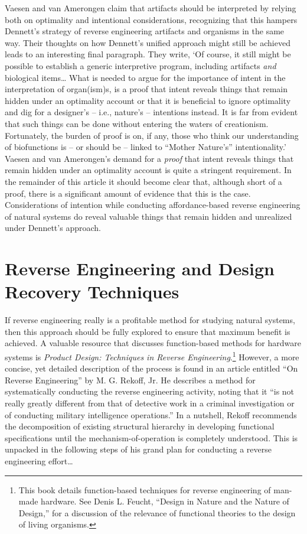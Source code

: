 Vaesen and van Amerongen claim that artifacts should be interpreted by
relying both on optimality and intentional considerations, recognizing
that this hampers Dennett’s strategy of reverse engineering artifacts
and organisms in the same way.\citep[][pgs. 794--795]{vaesenamerongen2008} Their thoughts on
how Dennett’s unified approach might still be achieved leads to an
interesting final paragraph. They write, ‘Of course, it still might be
possible to establish a generic interpretive program, including
artifacts \textit{and} biological items… What is needed to argue for
the importance of intent in the interpretation of organ(ism)s, is a
proof that intent reveals things that remain hidden under an optimality
account or that it is beneficial to ignore optimality and dig for a
designer’s – i.e., nature’s – intentions instead. It is far from
evident that such things can be done without entering the waters of
creationism. Fortunately, the burden of proof is on, if any, those who
think our understanding of biofunctions is – or should be – linked to
“Mother Nature’s” intentionality.’\citep[][pg. 795]{vaesenamerongen2008} Vaesen and van
Amerongen’s demand for a \textit{proof} that intent reveals things that
remain hidden under an optimality account is quite a stringent
requirement. In the remainder of this article it should become clear
that, although short of a proof, there is a significant amount of
evidence that this is the case. Considerations of intention while
conducting affordance-based reverse engineering of natural systems do
reveal valuable things that remain hidden and unrealized under
Dennett’s approach.

\section{Reverse Engineering and Design Recovery Techniques}

If reverse engineering really is a profitable method for studying
natural systems, then this approach should be fully explored to ensure
that maximum benefit is achieved. A valuable resource that discusses
function-based methods for hardware systems is \textit{Product Design:
Techniques in Reverse Engineering}.\citep{ottowood2001}\footnote{
This book details function-based
techniques for reverse engineering of man-made hardware. See Denis L.
Feucht, “Design in Nature and the Nature of Design,”\citep{feucht1999} 
for a discussion of the relevance of
functional theories to the design of living organisms.
} However, a more
concise, yet detailed description of the process is found in an article
entitled “On Reverse Engineering” by M. G. Rekoff,
Jr.\citep{rekoff1985} He describes a method for systematically
conducting the reverse engineering activity, noting that it “is not
really greatly different from that of detective work in a criminal
investigation or of conducting military intelligence
operations.”\citep[][pg. 245]{rekoff1985} In a nutshell, Rekoff recommends the
decomposition of existing structural hierarchy in developing functional
specifications until the mechanism-of-operation is completely
understood. This is unpacked in the following steps of his grand plan
for conducting a reverse engineering effort…

